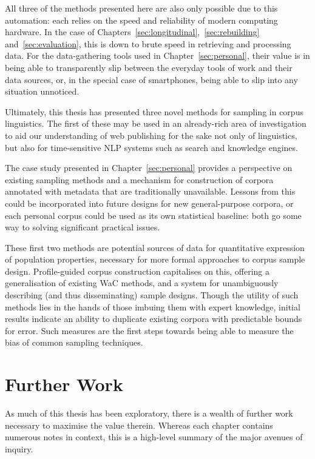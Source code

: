 All three of the methods presented here are also only possible due to this automation: each relies on the speed and reliability of modern computing hardware.  In the case of Chapters~\ref{sec:longitudinal},~\ref{sec:rebuilding} and~\ref{sec:evaluation}, this is down to brute speed in retrieving and processing data.  For the data-gathering tools used in Chapter~\ref{sec:personal}, their value is in being able to transparently slip between the everyday tools of work and their data sources, or, in the special case of smartphones, being able to slip into any situation unnoticed.

Ultimately, this thesis has presented three novel methods for sampling in corpus linguistics.  The first of these may be used in an already-rich area of investigation to aid our understanding of web publishing for the sake not only of linguistics, but also for time-sensitive NLP systems such as search and knowledge engines.

The case study presented in Chapter~\ref{sec:personal} provides a perspective on existing sampling methods and a mechanism for construction of corpora annotated with metadata that are traditionally unavailable.  Lessons from this could be incorporated into future designs for new general-purpose corpora, or each personal corpus could be used as its own statistical baseline: both go some way to solving significant practical issues.

These first two methods are potential sources of data for quantitative expression of population properties, necessary for more formal approaches to corpus sample design.  Profile-guided corpus construction capitalises on this, offering a generalisation of existing WaC methods, and a system for unambiguously describing (and thus disseminating) sample designs.  Though the utility of such methods lies in the hands of those imbuing them with expert knowledge, initial results indicate an ability to duplicate existing corpora with predictable bounds for error.  Such measures are the first steps towards being able to measure the bias of common sampling techniques.








\section{Further Work}
As much of this thesis has been exploratory, there is a wealth of further work necessary to maximise the value therein.  Whereas each chapter contains numerous notes in context, this is a high-level summary of the major avenues of inquiry.


